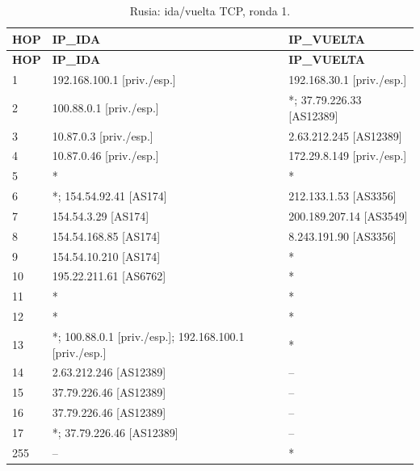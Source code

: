 \begin{longtable}{p{0.95cm}p{7.075cm}p{7.075cm}}
\caption{Rusia: ida/vuelta TCP, ronda 1.}\label{anexo:vuelta:37.79.226.46:TCP:1} \\
\toprule
\textbf{HOP} & \textbf{IP\_\allowbreak{}IDA} & \textbf{IP\_\allowbreak{}VUELTA} \\ \midrule
\endfirsthead
\toprule
\textbf{HOP} & \textbf{IP\_\allowbreak{}IDA} & \textbf{IP\_\allowbreak{}VUELTA} \\ \midrule
\endhead
1 & 192.168.100.1 [priv./esp.] & 192.168.30.1 [priv./esp.] \\
2 & 100.88.0.1 [priv./esp.] & *; 37.79.226.33 [AS12389] \\
3 & 10.87.0.3 [priv./esp.] & 2.63.212.245 [AS12389] \\
4 & 10.87.0.46 [priv./esp.] & 172.29.8.149 [priv./esp.] \\
5 & * & * \\
6 & *; 154.54.92.41 [AS174] & 212.133.1.53 [AS3356] \\
7 & 154.54.3.29 [AS174] & 200.189.207.14 [AS3549] \\
8 & 154.54.168.85 [AS174] & 8.243.191.90 [AS3356] \\
9 & 154.54.10.210 [AS174] & * \\
10 & 195.22.211.61 [AS6762] & * \\
11 & * & * \\
12 & * & * \\
13 & *; 100.88.0.1 [priv./esp.]; 192.168.100.1 [priv./esp.] & * \\
14 & 2.63.212.246 [AS12389] & -- \\
15 & 37.79.226.46 [AS12389] & -- \\
16 & 37.79.226.46 [AS12389] & -- \\
17 & *; 37.79.226.46 [AS12389] & -- \\
255 & -- & * \\
\bottomrule
\end{longtable}
\endgroup
\begingroup
\fontsize{8}{10}\selectfont
